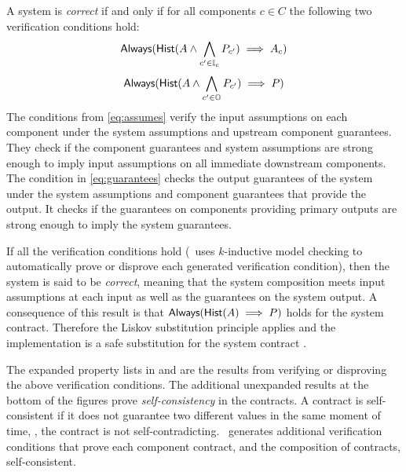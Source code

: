 A system is
\emph{correct} if and only if for all components $c \in C$ the
following two verification conditions hold:
\begin{equation}\label{eq:assumes}
            \mathsf{Always}(\mathsf{Hist}(A \wedge
            \bigwedge_{c^\prime \in \mathbb{I}_{c}} P_{c^\prime})
            \implies A_{c})
\end{equation}
\begin{equation}\label{eq:guarantees}
            \mathsf{Always}(\mathsf{Hist}(A \wedge
            \bigwedge_{c^\prime \in \mathbb{O}} P_{c^\prime})
            \implies P)
\end{equation}
The conditions from \eqref{eq:assumes} verify the input assumptions on
each component under the system assumptions and upstream component
guarantees.  They check if the component guarantees and system
assumptions are strong enough to imply input assumptions on all
immediate downstream components.  The condition in
\eqref{eq:guarantees} checks the output guarantees of the system under
the system assumptions and component guarantees that provide the
output.  It checks if the guarantees on components providing primary
outputs are strong enough to imply the system guarantees.

If all the verification conditions hold (\agr\ uses $k$-inductive
model checking to automatically prove or disprove each generated
verification condition), then the system is said to be \emph{correct},
meaning that the system composition meets input assumptions at each
input as well as the guarantees on the system output. A consequence of
this result is that $\mathsf{Always}(\mathsf{Hist}(A) \implies
P)$ holds for the system contract.  Therefore the Liskov
substitution principle applies and the implementation is a safe
substitution for the system contract \cite{10.1145/62139.62141}.

The expanded property lists in  and
 are the results from verifying or
disproving the above verification conditions.  The additional
unexpanded results at the bottom of the figures prove
\emph{self-consistency} in the contracts.
A contract is self-consistent if it does not guarantee two different values in the same moment of time, \ie, the contract is not self-contradicting.
\agr\ generates additional verification
conditions that prove each component contract, and the composition of
contracts, self-consistent.
